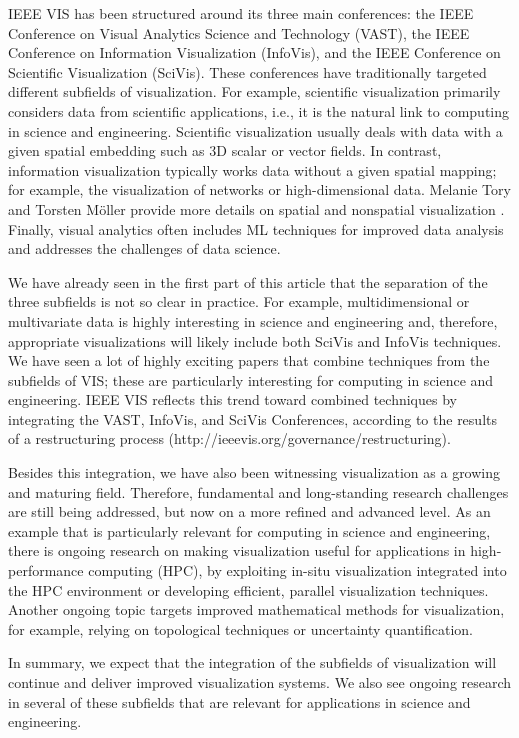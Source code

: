 \documentclass[10pt,journal,compsoc]{IEEEtran}
\begin{document}
{IEEE VIS has been structured around its three main conferences: the IEEE Conference on Visual Analytics Science and Technology (VAST), the IEEE Conference on Information Visualization (InfoVis), and the IEEE Conference on Scientific Visualization (SciVis). These conferences have traditionally targeted different subfields of visualization. For example, scientific visualization primarily considers data from scientific applications, i.e., it is the natural link to computing in science and engineering. Scientific visualization usually deals with data with a given spatial embedding such as 3D scalar or vector fields. In contrast, information visualization typically works data without a given spatial mapping; for example, the visualization of networks or high-dimensional data. Melanie Tory and Torsten M{\"o}ller provide more details on spatial and nonspatial visualization \cite{ToryM04}. Finally, visual analytics often includes ML techniques for improved data analysis and addresses the challenges of data science.

We have already seen in the first part of this article that the separation of the three subfields is not so clear in practice. For example, multidimensional or multivariate data is highly interesting in science and engineering and, therefore, appropriate visualizations will likely include both SciVis and InfoVis techniques. We have seen a lot of highly exciting papers that combine techniques from the subfields of VIS; these are particularly interesting for computing in science and engineering. 
IEEE VIS reflects this trend toward combined techniques by integrating the VAST, InfoVis, and SciVis Conferences, according to the results of a restructuring process (http://ieeevis.org/governance/restructuring).

Besides this integration, we have also been witnessing visualization as a growing and maturing field. Therefore, fundamental and long-standing research challenges are still being addressed, but now on a more refined and advanced level. As an example that is particularly relevant for computing in science and engineering, there is ongoing research on making visualization useful for applications in high-performance computing (HPC), by exploiting in-situ visualization integrated into the HPC environment or developing efficient, parallel visualization techniques. Another ongoing topic targets improved mathematical methods for visualization, for example, relying on topological techniques or uncertainty quantification. 

In summary, we expect that the integration of the subfields of visualization will continue and deliver improved visualization systems. We also see ongoing research in several of these subfields that are relevant for applications in science and engineering.


}
\end{document}
